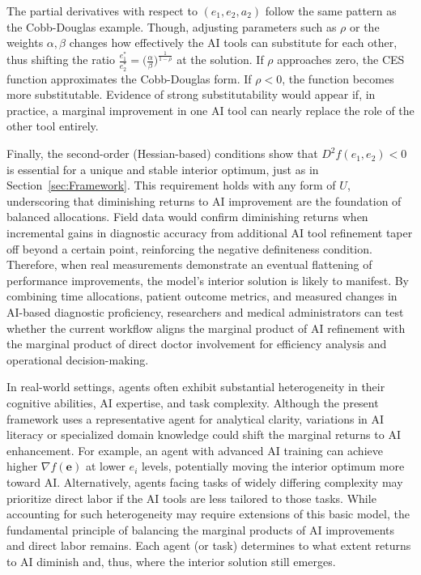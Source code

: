 The partial derivatives with respect to $(e_1, e_2, a_2)$ follow the same pattern as the Cobb-Douglas example. Though, adjusting parameters such as $\rho$ or the weights $\alpha,\beta$ changes how effectively the AI tools can substitute for each other, thus shifting the ratio $\tfrac{e_1^*}{e_2^*}=\bigl(\tfrac{\alpha}{\beta}\bigr)^{\tfrac{1}{1-\rho}}$ at the solution. If $\rho$ approaches zero, the CES function approximates the Cobb-Douglas form. If $\rho < 0$, the function becomes more substitutable. Evidence of strong substitutability would appear if, in practice, a marginal improvement in one AI tool can nearly replace the role of the other tool entirely.

Finally, the second-order (Hessian-based) conditions show that $D^2 f(e_1,e_2)<0$ is essential for a unique and stable interior optimum, just as in Section~\ref{sec:Framework}. This requirement holds with any form of $U$, underscoring that diminishing returns to AI improvement are the foundation of balanced allocations. Field data would confirm diminishing returns when incremental gains in diagnostic accuracy from additional AI tool refinement taper off beyond a certain point, reinforcing the negative definiteness condition. Therefore, when real measurements demonstrate an eventual flattening of performance improvements, the model’s interior solution is likely to manifest. By combining time allocations, patient outcome metrics, and measured changes in AI-based diagnostic proficiency, researchers and medical administrators can test whether the current workflow aligns the marginal product of AI refinement with the marginal product of direct doctor involvement for efficiency analysis and operational decision-making.

In real-world settings, agents often exhibit substantial heterogeneity in their cognitive abilities, AI expertise, and task complexity. Although the present framework uses a representative agent for analytical clarity, variations in AI literacy or specialized domain knowledge could shift the marginal returns to AI enhancement. For example, an agent with advanced AI training can achieve higher $\nabla f(\mathbf{e})$ at lower $e_i$ levels, potentially moving the interior optimum more toward AI. Alternatively, agents facing tasks of widely differing complexity may prioritize direct labor if the AI tools are less tailored to those tasks. While accounting for such heterogeneity may require extensions of this basic model, the fundamental principle of balancing the marginal products of AI improvements and direct labor remains. Each agent (or task) determines to what extent returns to AI diminish and, thus, where the interior solution still emerges.

